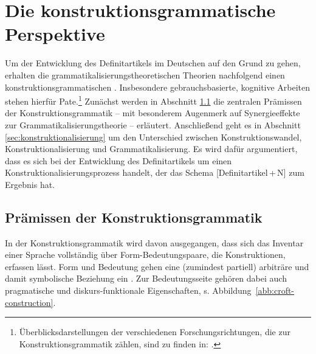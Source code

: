 \section{Die konstruktionsgrammatische Perspektive}\label{sec:kxg}
Um der Entwicklung des Definitartikels im Deutschen auf den Grund zu gehen, erhalten die grammatikalisierungstheoretischen Theorien nachfolgend einen konstruktionsgrammatischen . Insbesondere gebrauchsbasierte, kognitive  Arbeiten \parencite[u.a.][]{Langacker1987,Goldberg1995,Goldberg2006,Croft2002,Croft2004,Bybee2006,Bybee2010} stehen hierfür Pate.\footnote{Überblicksdarstellungen der verschiedenen Forschungsrichtungen, die zur Konstruktionsgrammatik zählen, sind zu finden in:   \textcite{Croft2004,Imo2007,Stefanowitsch2011,Hoffmann2013,Ziem2013}.} Zunächst werden in Abschnitt \ref{sec:kxg-grundlagen} die zentralen Prämissen der Konstruktionsgrammatik -- mit besonderem Augenmerk auf Synergieeffekte zur Grammatikalisierungstheorie -- erläutert. Anschließend geht es in Abschnitt \ref{sec:konstruktionalisierung} um den Unterschied zwischen Konstruktionswandel,  Konstruktionalisierung und Grammatikalisierung. Es wird dafür argumentiert, dass es sich bei der Entwicklung des Definitartikels um einen Konstruktionalisierungsprozess handelt, der das Schema [Definitartikel\,+\,N] zum Ergebnis hat.  

\subsection{Prämissen der Konstruktionsgrammatik}\label{sec:kxg-grundlagen}


In der Konstruktionsgrammatik wird davon ausgegangen, dass sich das Inventar einer Sprache vollständig über Form-Bedeutungspaare, die Konstruktionen, erfassen lässt. Form und Bedeutung gehen eine (zumindest partiell) arbiträre und damit symbolische Beziehung ein \parencite[257]{Croft2004}. Zur Bedeutungsseite gehören dabei auch pragmatische und diskurs-funktionale Eigenschaften, s. Abbildung~\ref{abb:croft-construction}.  

